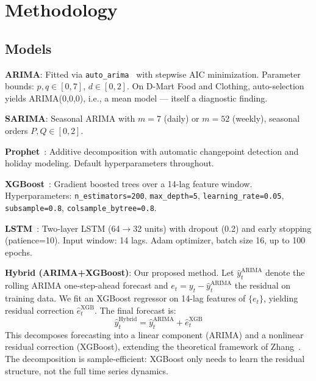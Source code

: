 \documentclass[journal]{IEEEtran}
\begin{document}
\section{Methodology}
\label{sec:method}

\subsection{Models}
\label{sec:models}

\textbf{ARIMA}: Fitted via \texttt{auto\_arima}~\cite{hyndman2018forecasting} with stepwise AIC minimization. Parameter bounds: $p,q\in[0,7]$, $d\in[0,2]$. On D-Mart Food and Clothing, auto-selection yields ARIMA(0,0,0), i.e., a mean model — itself a diagnostic finding.

\textbf{SARIMA}: Seasonal ARIMA with $m=7$ (daily) or $m=52$ (weekly), seasonal orders $P,Q\in[0,2]$.

\textbf{Prophet}~\cite{taylor2018forecasting}: Additive decomposition with automatic changepoint detection and holiday modeling. Default hyperparameters throughout.

\textbf{XGBoost}~\cite{chen2016xgboost}: Gradient boosted trees over a 14-lag feature window. Hyperparameters: \texttt{n\_estimators=200}, \texttt{max\_depth=5}, \texttt{learning\_rate=0.05}, \texttt{subsample=0.8}, \texttt{colsample\_bytree=0.8}.

\textbf{LSTM}~\cite{hochreiter1997long}: Two-layer LSTM (64$\to$32 units) with dropout (0.2) and early stopping (patience=10). Input window: 14 lags. Adam optimizer, batch size 16, up to 100 epochs.

\textbf{Hybrid (ARIMA+XGBoost)}: Our proposed method. Let $\hat{y}^{\text{ARIMA}}_t$ denote the rolling ARIMA one-step-ahead forecast and $e_t = y_t - \hat{y}^{\text{ARIMA}}_t$ the residual on training data. We fit an XGBoost regressor on 14-lag features of $\{e_t\}$, yielding residual correction $\hat{e}^{\text{XGB}}_t$. The final forecast is:
\begin{equation}
  \hat{y}^{\text{Hybrid}}_t = \hat{y}^{\text{ARIMA}}_t + \hat{e}^{\text{XGB}}_t
  \label{eq:hybrid}
\end{equation}
This decomposes forecasting into a linear component (ARIMA) and a nonlinear residual correction (XGBoost), extending the theoretical framework of Zhang~\cite{zhang2003time}. The decomposition is sample-efficient: XGBoost only needs to learn the residual structure, not the full time series dynamics.
\end{document}
